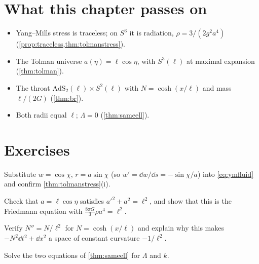 \section*{What this chapter passes on}
\begin{itemize}[nosep]
\item Yang--Mills stress is traceless; on $S^3$ it is radiation, $\rho=3/(2g^2a^4)$ (\cref{prop:traceless,thm:tolmanstress}).
\item The Tolman universe $a(\eta)=\ell\cos\eta$, with $S^3(\ell)$ at maximal expansion (\cref{thm:tolman}).
\item The throat $\mathrm{AdS}_2(\ell)\times S^2(\ell)$ with $N=\cosh(x/\ell)$ and mass $\ell/(2G)$ (\cref{thm:br}).
\item Both radii equal $\ell$; $\Lambda=0$ (\cref{thm:sameell}).
\end{itemize}

\section*{Exercises}
\begin{exercise}
Substitute $w=\cos\chi$, $r=a\sin\chi$ (so $w'=\dd w/\dd s=-\sin\chi/a$) into \eqref{eq:ymfluid} and confirm \cref{thm:tolmanstress}(i).
\end{exercise}
\begin{exercise}
Check that $a=\ell\cos\eta$ satisfies $a'^2+a^2=\ell^2$, and show that this is the Friedmann equation with $\frac{8\pi G}3\rho a^4=\ell^2$.
\end{exercise}
\begin{exercise}
Verify $N''=N/\ell^2$ for $N=\cosh(x/\ell)$ and explain why this makes $-N^2\dd t^2+\dd x^2$ a space of constant curvature $-1/\ell^2$.
\end{exercise}
\begin{exercise}
Solve the two equations of \cref{thm:sameell} for $\Lambda$ and $k$.
\end{exercise}

